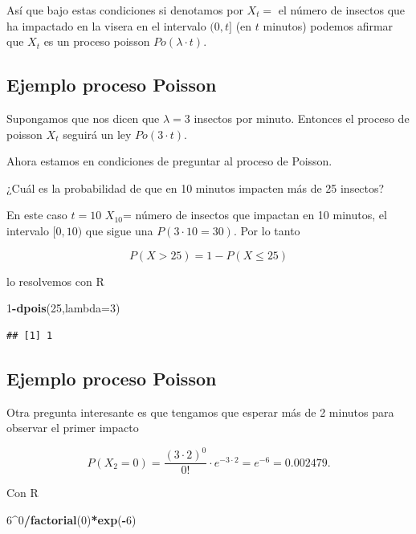 \documentclass[]{book}
\newenvironment{Shaded}{\begin{snugshade}}{\end{snugshade}}
\newcommand{\DataTypeTok}[1]{\textcolor[rgb]{0.13,0.29,0.53}{#1}}
\newcommand{\DecValTok}[1]{\textcolor[rgb]{0.00,0.00,0.81}{#1}}
\newcommand{\KeywordTok}[1]{\textcolor[rgb]{0.13,0.29,0.53}{\textbf{#1}}}
\newcommand{\NormalTok}[1]{#1}
\newcommand{\OperatorTok}[1]{\textcolor[rgb]{0.81,0.36,0.00}{\textbf{#1}}}
\begin{document}
Así que bajo estas condiciones si denotamos por \(X_t=\) el número de insectos que ha impactado en la visera en el intervalo \((0,t]\) (en \(t\) minutos) podemos afirmar que \(X_t\) es un proceso poisson \(Po(\lambda\cdot t)\).

\hypertarget{ejemplo-proceso-poisson-1}{%
\subsection{Ejemplo proceso Poisson}\label{ejemplo-proceso-poisson-1}}

Supongamos que nos dicen que \(\lambda=3\) insectos por minuto. Entonces el proceso de poisson \(X_t\) seguirá un ley \(Po(3\cdot t).\)

Ahora estamos en condiciones de preguntar al proceso de Poisson.

¿Cuál es la probabilidad de que en 10 minutos impacten más de 25 insectos?

En este caso \(t=10\) \(X_{10}\)= número de insectos que impactan en 10 minutos, el intervalo \([0,10)\) que sigue una \(P(3\cdot 10=30)\). Por lo tanto

\[P(X>25)=1-P(X\leq 25)\]

lo resolvemos con R

\begin{Shaded}
\begin{Highlighting}[]
\DecValTok{1}\OperatorTok{-}\KeywordTok{dpois}\NormalTok{(}\DecValTok{25}\NormalTok{,}\DataTypeTok{lambda=}\DecValTok{3}\NormalTok{)}
\end{Highlighting}
\end{Shaded}

\begin{verbatim}
## [1] 1
\end{verbatim}

\hypertarget{ejemplo-proceso-poisson-2}{%
\subsection{Ejemplo proceso Poisson}\label{ejemplo-proceso-poisson-2}}

Otra pregunta interesante es que tengamos que esperar más de 2 minutos para observar el primer impacto

\[P(X_2=0)=\frac{(3\cdot 2)^0}{0!}\cdot e^{-3\cdot 2}= e^{-6}=0.002479.\]

Con R

\begin{Shaded}
\begin{Highlighting}[]
\DecValTok{6}\OperatorTok{^}\DecValTok{0}\OperatorTok{/}\KeywordTok{factorial}\NormalTok{(}\DecValTok{0}\NormalTok{)}\OperatorTok{*}\KeywordTok{exp}\NormalTok{(}\OperatorTok{-}\DecValTok{6}\NormalTok{)}
\end{Highlighting}
\end{Shaded}
\end{document}
